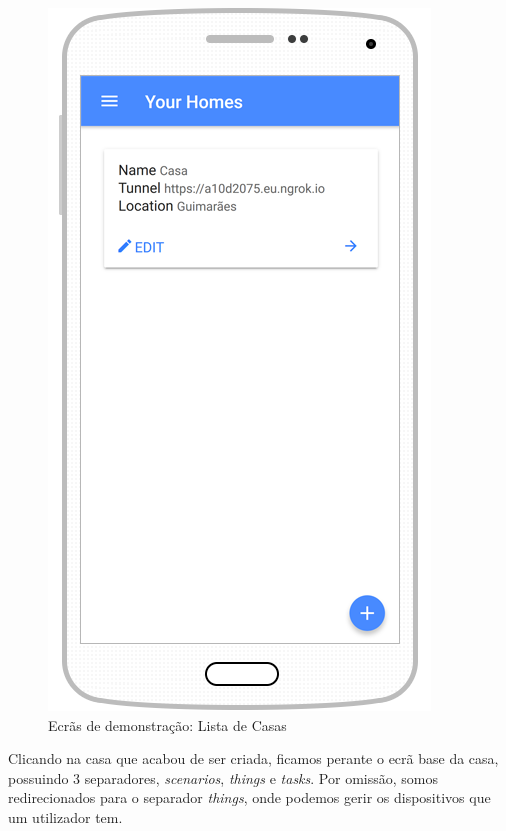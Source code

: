 \begin{figure}[H]
  \centering
        \includegraphics[scale=0.75]{img/demo/list_home.png}
  \caption{Ecrãs de demonstração: Lista de Casas}
\end{figure}

Clicando na casa que acabou de ser criada, ficamos perante o ecrã base da casa, possuindo 3 separadores, \textit{scenarios}, \textit{things} e \textit{tasks}. Por omissão, somos redirecionados para o separador \textit{things}, onde podemos gerir os dispositivos que um utilizador tem.

